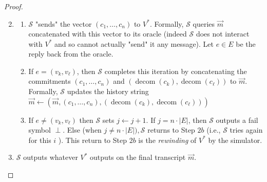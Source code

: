 \documentclass{beamer}
\begin{document}
    \begin{frame}
        \frametitle{}
        \begin{proof}
            \begin{enumerate}
                \setcounter{enumi}{1}
                \item 
                
                \begin{enumerate} [d]
                   
                    \item $\mathcal{S}$ "sends" the vector $\left(c_{1}, \ldots, c_{n}\right)$ to $V^{*}$. Formally, $\mathcal{S}$ queries $\vec{m}$ concatenated with this vector to its oracle (indeed $\mathcal{S}$ does not interact with $V^{*}$ and so cannot actually "send" it any message). Let $e \in E$ be the reply back from the oracle.
                    \item If $e=\left(v_{k}, v_{\ell}\right)$, then $\mathcal{S}$ completes this iteration by concatenating the commitments $\left(c_{1}, \ldots, c_{n}\right)$ and $\left(\operatorname{decom}\left(c_{k}\right),\operatorname{decom}\left(c_{\ell}\right)\right)$ to $\vec{m} .$ Formally, $\mathcal{S}$ updates the history string $\vec{m} \leftarrow\left(\vec{m},\left(c_{1}, \ldots, c_{n}\right),\left(\operatorname{decom}\left(c_{k}\right), \operatorname{decom}\left(c_{\ell}\right)\right)\right)$ 
                    \item  If $e \neq\left(v_{k}, v_{\ell}\right)$ then $\mathcal{S}$ sets $j \leftarrow j+1$. If $j=n \cdot|E|$, then $\mathcal{S}$ outputs a fail symbol $\perp$. Else (when $j \neq n \cdot|E|), \mathcal{S}$ returns to Step $2b$ (i.e., $\mathcal{S}$ tries again for this $i$ ). This return to Step $2b$ is the \emph{rewinding} of $V^{*}$ by the simulator.
                \end{enumerate}

                \item $\mathcal{S}$ outputs whatever $V^{*}$ outputs on the final transcript $\vec{m}$.
            \end{enumerate}
        \end{proof}
        
    
    \end{frame}
\end{document}
